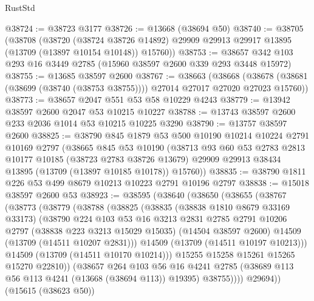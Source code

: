 \begin{lexlean}{RustStd}
\begin{coremodule}
@38724 := @38723 @3177
@38726 := @13668 (@38694 @50)
@38740 := @38705
    (@38708
      (@38720
        (@38724 @38726 @14892)
        @29909
        @29913
        @29917
        @13895
        (@13709 (@13897 @10154 @10148))
        @15760))
@38753 := @38657 @342 @103 @293 @16 @3449 @2785 (@15960 @38597 @2600 @339 @293 @3448 @15972)
@38755 := @13685 @38597 @2600
@38767 := @38663
    (@38668 (@38678 (@38681 (@38699 (@38740 (@38753 @38755)))) @27014 @27017 @27020 @27023 @15760))
@38773 := @38657 @2047 @551 @53 @58 @10229 @4243
@38779 := @13942 @38597 @2600 @2047 @53 @10215 @10227
@38788 := @13743 @38597 @2600 @233 @2036 @1014 @53 @10215 @10225 @3290
@38790 := @13757 @38597 @2600
@38825 := @38790
    @845
    @1879
    @53
    @500
    @10190
    @10214
    @10224
    @2791
    @10169
    @2797
    (@38665
      @845
      @53
      @10190
      (@38713
        @93
        @60
        @53
        @2783
        @2813
        @10177
        @10185
        (@38723 @2783 @38726 @13679)
        @29909
        @29913
        @38434
        @13895
        (@13709 (@13897 @10185 @10178))
        @15760))
@38835 := @38790 @1811 @226 @53 @499 @8679 @10213 @10223 @2791 @10196 @2797
@38838 := @15018 @38597 @2600 @53
@38923 := @38595
    (@38640
      (@38650
        (@38655
          (@38767
            (@38773
              (@38779
                (@38788
                  (@38825
                    (@38835
                      (@38838 @1810 @8679 @33169 @33173)
                      (@38790
                        @224
                        @103
                        @53
                        @16
                        @3213
                        @2831
                        @2785
                        @2791
                        @10206
                        @2797
                        (@38838 @223 @3213 @15029 @15035)
                        (@14504 @38597 @2600)
                        @14509
                        (@13709 (@14511 @10207 @2831)))
                      @14509
                      (@13709 (@14511 @10197 @10213)))
                    @14509
                    (@13709 (@14511 @10170 @10214)))
                  @15255
                  @15258
                  @15261
                  @15265
                  @15270
                  @22810))
              (@38657
                @264
                @103
                @56
                @16
                @4241
                @2785
                (@38689 @113 @56 @113 @4241 (@13668 (@38694 @113)) @19395)
                @38755))))
        @29694))
    (@15615 (@38623 @50))

\end{coremodule}
\end{lexlean}
